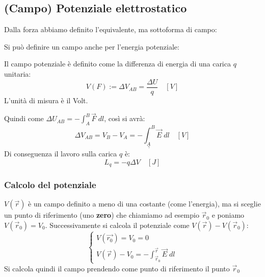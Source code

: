 \documentclass[a4paper]{article}
\begin{document}
\subsection{(Campo) Potenziale elettrostatico}
Dalla forza abbiamo definito l'equivalente, ma sottoforma di campo:
\begin{figure}[H]
  \centering
\end{figure}
\noindent
Si può definire un campo anche per l'energia potenziale:
\begin{figure}[H]
  \centering
\end{figure}

\begin{definition}
  Il campo potenziale è definito come la differenza di energia di una carica \( q \) 
  unitaria:
  \[
    V(F) := \Delta V_{AB} = \frac{\Delta U}{q} \quad \left[ V \right]
  \] 
  L'unità di misura è il Volt.

  \vspace{1em}
  \noindent
  Quindi come \( \Delta U_{AB} = - \int_A^B \vec{F} \; dl \), così si avrà:
  \[
    \Delta V_{AB} = V_B - V_A = - \int_{\underset{\gamma}{A}}^B \vec{E} \; dl \quad \left[ V \right]
  \] 
  Di conseguenza il lavoro sulla carica \( q \) è:
  \[
    L_q = - q \Delta V \quad \left[ J \right]
  \] 
\end{definition}

\subsubsection{Calcolo del potenziale}
\( V(\vec{r}) \) è un campo definito a meno di una costante (come l'energia), ma si
sceglie un punto di riferimento (uno \textbf{zero}) che chiamiamo ad esempio \( \vec{r}_0 \)
e poniamo \( V(\vec{r}_0) = V_0 \). Successivamente si calcola il potenziale come
\( V(\vec{r}) - V(\vec{r}_0)\):
\[
\begin{cases}
  V(\vec{r_0}) = V_0 = 0\\
  V(\vec{r}) - V_0 = - \int_{\vec{r}_0}^{\vec{r}} \vec{E} \; dl
\end{cases}
\] 
Si calcola quindi il campo prendendo come punto di riferimento il punto \( \vec{r}_0 \) 
\end{document}
